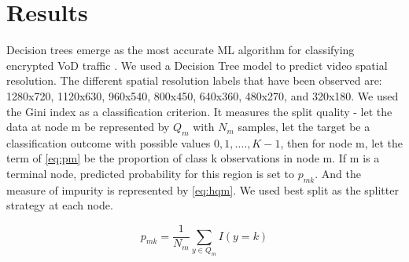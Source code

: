 \section{Results} 
Decision trees emerge as the most accurate ML algorithm for classifying encrypted VoD traffic \cite{orsolic2018youtube} \cite{dimopoulos2016measuring} \cite{orsolic2017machine}. We used a Decision Tree model to predict video spatial resolution. The different spatial resolution labels that have been observed are: 1280x720, 1120x630, 960x540, 800x450, 640x360, 480x270, and 320x180. We used the Gini \cite{gini1936measure} index as a classification criterion. It measures the split quality - let the data at node m be represented by $Q_m$ with $N_m$ samples, let the target be a classification outcome with possible values $0, 1, …., K-1$, then for node m, let the term of \cref{eq:pm} be the proportion of class k observations in node m. If m is a terminal node, predicted probability for this region is set to $p_{mk}$. And the measure of impurity is represented by \cref{eq:hqm}. We used best split as the splitter strategy at each node.

\begin{equation}
    p_{mk} = \frac{1}{N_m}\sum_{y \in Q_m}I(y=k)
    \label{eq:pm}
\end{equation}

